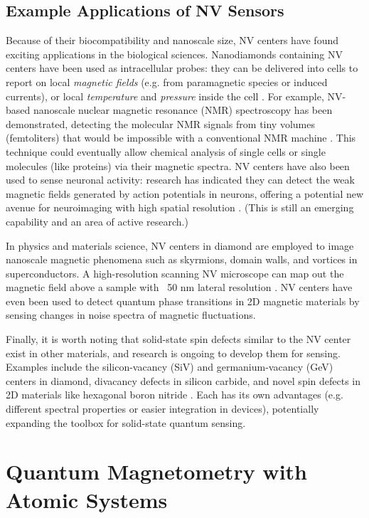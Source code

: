 \subsection*{Example Applications of NV Sensors}

Because of their biocompatibility and nanoscale size, NV centers have
found exciting applications in the biological sciences. Nanodiamonds
containing NV centers have been used as intracellular probes: they can
be delivered into cells to report on local \textit{magnetic fields}
(e.g. from paramagnetic species or induced currents), or local
\textit{temperature} and \textit{pressure} inside the cell . For
example, NV-based nanoscale nuclear magnetic resonance (NMR)
spectroscopy has been demonstrated, detecting the molecular NMR
signals from tiny volumes (femtoliters) that would be impossible with
a conventional NMR machine . This technique could eventually allow
chemical analysis of single cells or single molecules (like proteins)
via their magnetic spectra. NV centers have also been used to sense
neuronal activity: research has indicated they can detect the weak
magnetic fields generated by action potentials in neurons, offering a
potential new avenue for neuroimaging with high spatial resolution
. (This is still an emerging capability and an area of active
research.)



In physics and materials science, NV centers in diamond are employed
to image nanoscale magnetic phenomena such as skyrmions, domain walls,
and vortices in superconductors. A high-resolution scanning NV
microscope can map out the magnetic field above a sample with ~50 nm
lateral resolution . NV centers have even been used to detect quantum
phase transitions in 2D magnetic materials by sensing changes in noise
spectra of magnetic fluctuations.



Finally, it is worth noting that solid-state spin defects similar to
the NV center exist in other materials, and research is ongoing to
develop them for sensing. Examples include the silicon-vacancy (SiV)
and germanium-vacancy (GeV) centers in diamond, divacancy defects in
silicon carbide, and novel spin defects in 2D materials like hexagonal
boron nitride . Each has its own advantages (e.g. different spectral
properties or easier integration in devices), potentially expanding
the toolbox for solid-state quantum sensing.



\section{Quantum Magnetometry with Atomic Systems}\label{sec:magnetometry}


